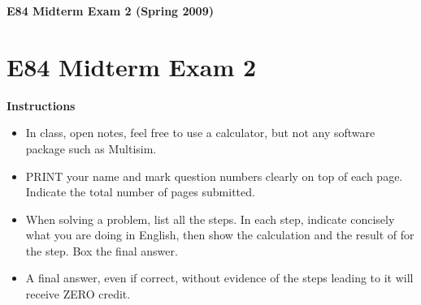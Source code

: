 \usepackage{html}

\begin{center}
{\Large \bf  E84 Midterm Exam 2 (Spring 2009)}
\end{center}

\section*{E84 Midterm Exam 2}

{\bf Instructions}
\begin{itemize}
\item In class, open notes, feel free to use a calculator, but not any software 
  package such as Multisim. 
\item PRINT your name and mark question numbers clearly on top of each page.
  Indicate the total number of pages submitted.
\item When solving a problem, list all the steps. In each step, indicate
  concisely what you are doing in English, then show the calculation 
  and the result of for the step. Box the final answer.
\item A final answer, even if correct, without evidence of the steps leading
  to it will receive ZERO credit.
\end{itemize}


